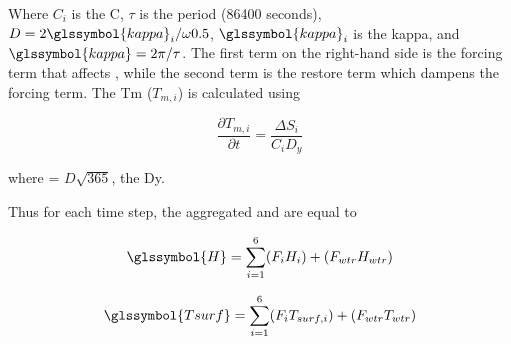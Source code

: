 \documentclass[final,3p,times,authoryear]{elsarticle}
\begin{document}
Where $C_{i}$ is the \glsdesc{C}, $\tau$ is the period (86400 seconds), $D = 2 \glssymbol{kappa} _{i}  / \omega 0.5$, $\glssymbol{kappa} _{i}$ is the \glsdesc{kappa}, and $\glssymbol{kappa} = 2\pi / \tau$.  The first term on the right-hand side is the forcing term that affects , while the second term is the restore term which dampens the forcing term. The \glsdesc{Tm} ($T_{m,i}$) is calculated using

\begin{equation} 
\frac{\partial T_{m,i}}{\partial t} = \frac{\Delta S_{i}}{C_{i} D_{y}}
\label{eq:tm} \end{equation} 

where  = $D \sqrt{365}$, the \glsdesc{Dy}. 

Thus for each time step, the aggregated  and  are equal to

\begin{equation} 
\glssymbol{H} = \sum_{i=1}^{6} (F_{i} H_{i}) + (F_{wtr} H_{wtr})
\label{eq:H} \end{equation} 

\begin{equation} 
\glssymbol{Tsurf} = \sum_{i=1}^{6} (F_{i} T_{surf,i}) + (F_{wtr} T_{wtr})
\label{eq:tsurf} \end{equation} 
\end{document}
